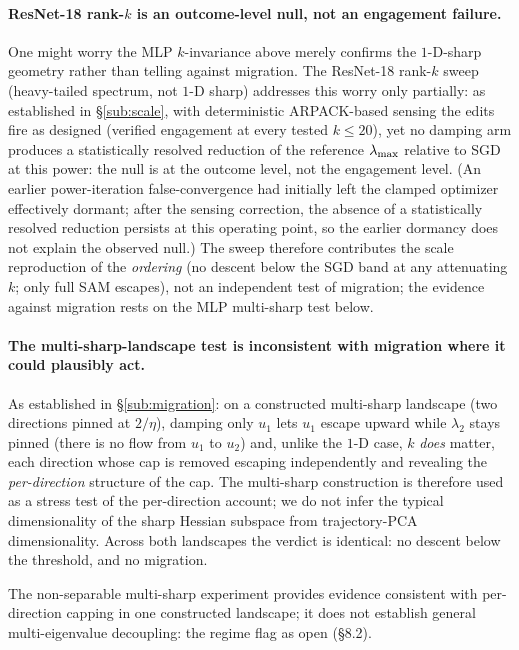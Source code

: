 \paragraph{ResNet-18 rank-$k$ is an outcome-level null, not an engagement
failure.}
One might worry the MLP $k$-invariance above merely confirms the $1$-D-sharp
geometry rather than telling against migration. The ResNet-18 rank-$k$ sweep
(heavy-tailed spectrum, not $1$-D sharp) addresses this worry only
partially: as established in \S\ref{sub:scale}, with deterministic
ARPACK-based sensing the edits fire as designed (verified engagement at
every tested $k\le20$), yet no damping arm produces a statistically resolved
reduction of the reference $\lambda_{\max}$ relative to SGD at this power: the null
is at the
outcome level, not the engagement level. (An earlier power-iteration
false-convergence had initially left the clamped optimizer effectively
dormant; after the sensing correction, the absence of a statistically
resolved reduction persists at this operating point, so the earlier
dormancy does not explain the observed null.) The sweep therefore contributes the scale reproduction of
the \emph{ordering} (no descent below the SGD band at any attenuating $k$; only full
SAM escapes), not an independent test of migration; the evidence against
migration rests on the MLP multi-sharp test below.

\paragraph{The multi-sharp-landscape test is inconsistent with migration where it could
plausibly act.}
As established in \S\ref{sub:migration}: on a constructed multi-sharp landscape
(two directions pinned at $2/\eta$), damping only $u_{1}$ lets $u_{1}$
escape upward while $\lambda_{2}$ stays pinned (there is no flow from $u_{1}$
to $u_{2}$) and, unlike the $1$-D case, $k$ \emph{does} matter, each direction
whose cap is removed escaping independently and revealing the
\emph{per-direction} structure of the cap. The multi-sharp construction is
therefore used as a stress test of the per-direction account; we do not infer
the typical dimensionality of the sharp Hessian subspace from
trajectory-PCA dimensionality. Across both landscapes the verdict is identical: no descent below the threshold, and
no migration.

The non-separable multi-sharp experiment provides evidence consistent with
per-direction capping in one constructed landscape; it does not establish
general multi-eigenvalue decoupling: the regime
\citet{damian2023selfstab} flag as open (\S8.2).

